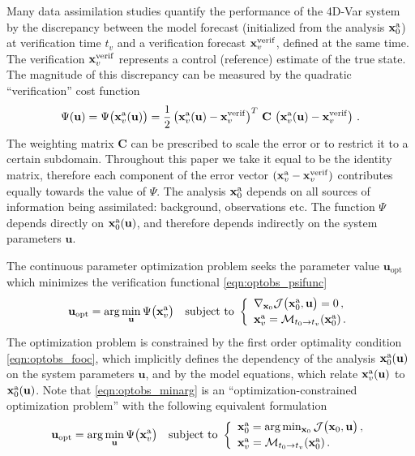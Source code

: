 \documentclass{article}
\newcommand{\Jfunc}{\mathcal J }
\newcommand{\Model}{\mathcal M}
\newcommand{\C}{\mathbf{C}}
\newcommand{\x}{   \mathbf{x} }
\newcommand{\xa}{ \mathbf{x}^{\rm a} }
\renewcommand{\u}{ \mathbf{u} }
\begin{document}
Many data assimilation studies \cite{daescu2004adaptive,gelaro2007examination,Daescu_2008}
quantify the performance of the 4D-Var system  by the discrepancy between the
model forecast (initialized from the analysis $\xa_0$) at verification time $t_v$ 
and a verification forecast $\x^{\rm verif}_v$, defined at the same time.
The verification $\x^{\rm verif}_v$ represents a control (reference) estimate of the true state.
The magnitude of this discrepancy can be measured by the quadratic ``verification'' cost function 
\begin{align}
  \Psi(\u) =   \Psi\bigl( \xa_v(\u) \bigr) = \frac{1}{2} \left( \xa_v(\u) - \x^{\rm verif}_v \right)^T \, \C \, \left( \xa_v(\u) - \x^{\rm verif}_v \right) \,. 
  \label{eqn:optobs_psifunc}
\end{align}
The weighting matrix $\C$ can be prescribed to scale the error or to restrict it
to a certain subdomain.
Throughout this paper we take it equal to be the identity matrix, therefore
each component of the error vector $(\xa_v - \x^{\rm verif}_v)$ contributes equally towards the value of $\Psi$.
The analysis $\xa_0$ depends on all sources of information being assimilated: background, observations etc.
The function $\Psi$ depends directly on $\xa_0(\u)$, and therefore depends indirectly on the system parameters $\u$.


The continuous parameter optimization problem seeks the parameter value $\u_\textrm{opt}$ which minimizes the verification functional \eqref{eqn:optobs_psifunc}
\begin{equation}
 \u_\textrm{opt} = \arg\min_{\u} \Psi\bigl(\xa_v\bigr) \quad \textnormal{subject to } 
 \left\{ 
 \begin{array}{l}
 \nabla_{\x_0} \Jfunc\bigl(\xa_0,\u\bigr) = 0\,, \\[2pt]
 \xa_v = \Model_{t_0 \rightarrow t_v} (\xa_0)\,.
 \end{array}
 \right. 
 \label{eqn:optobs_minarg}
\end{equation}
The optimization problem is constrained by the first order optimality condition \eqref{eqn:optobs_fooc},
which implicitly defines the dependency of the analysis $\xa_0(\u)$ on the system parameters $\u$,
and by the model equations, which relate $\xa_v(\u)$ to $\xa_0(\u)$. Note that \eqref{eqn:optobs_minarg}
is an ``optimization-constrained optimization problem'' with the following equivalent formulation 
\begin{equation}
 \u_\textrm{opt} = \arg\min_{\u} \Psi\bigl(\xa_v\bigr) \quad \textnormal{subject to } 
 \left\{ 
 \begin{array}{l}
 \xa_0 = \arg\min_{\x_0} \Jfunc\bigl(\x_0,\u\bigr)\,, \\[2pt]
\xa_v = \Model_{t_0 \rightarrow t_v} (\xa_0)\,.
\end{array}
 \right. 
 \label{eqn:optobs_minarg_alternative}
\end{equation}
\end{document}
